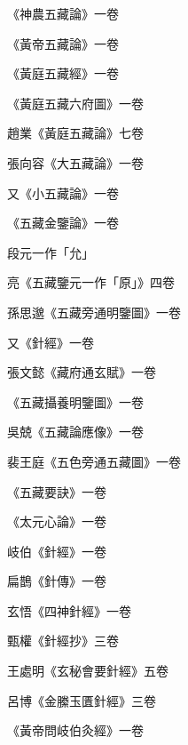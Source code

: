 \begin{pinyinscope}
 《神農五藏論》一卷



 《黃帝五藏論》一卷



 《黃庭五藏經》一卷



 《黃庭五藏六府圖》一卷



 趙業《黃庭五藏論》七卷



 張向容《大五藏論》一卷



 又《小五藏論》一卷



 《五藏金鑒論》一卷



 段元一作「允」



 亮《五藏鑒元一作「原」》四卷



 孫思邈《五藏旁通明鑒圖》一卷



 又《針經》一卷



 張文懿《藏府通玄賦》一卷



 《五藏攝養明鑒圖》一卷



 吳兢《五藏論應像》一卷



 裴王庭《五色旁通五藏圖》一卷



 《五藏要訣》一卷



 《太元心論》一卷



 岐伯《針經》一卷



 扁鵲《針傳》一卷



 玄悟《四神針經》一卷



 甄權《針經抄》三卷



 王處明《玄秘會要針經》五卷



 呂博《金縢玉匱針經》三卷



 《黃帝問岐伯灸經》一卷




\end{pinyinscope}
